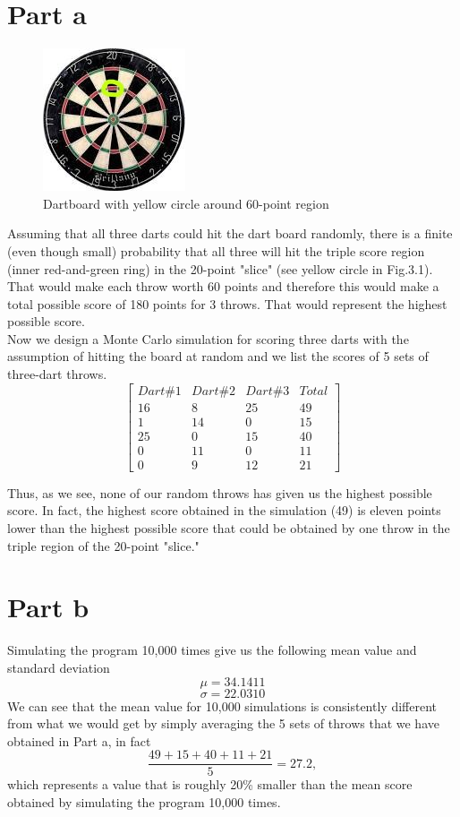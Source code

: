\section{Part a}
\begin{figure}[H]
	\centering
	\includegraphics[scale=1.5]{Dartboard_colors.jpg}
	\caption{Dartboard with yellow circle around 60-point region}
\end{figure}

Assuming that all three darts could hit the dart board randomly, there is a finite (even though small) probability that all three will hit the triple score region (inner red-and-green ring) in the 20-point "slice" (see yellow circle in Fig.3.1). That would make each throw worth 60 points and therefore this would make a total possible score of 180 points for 3 throws. That would represent the highest possible score.\\
Now we design a Monte Carlo simulation for scoring three darts with the assumption of hitting the board at random and we list the scores of 5 sets of three-dart throws.
\[
\begin{bmatrix} 
      					Dart\#1 & Dart\#2 & Dart\#3 & Total \\
     					 16 & 8 & 25 & 49\\
					 1 & 14 & 0 & 15\\
					 25 & 0 & 15 & 40\\
					 0 & 11 & 0 & 11\\
					 0 & 9 & 12 & 21			  
\end{bmatrix}
\]

Thus, as we see, none of our random throws has given us the highest possible score. In fact, the highest score obtained in the simulation (49) is eleven points lower than the highest possible score that could be obtained by one throw in the triple region of the 20-point "slice."\\

\section{Part b}
Simulating the program 10,000 times give us the following mean value and standard deviation
$$
\mu = 34.1411
$$
$$
\sigma = 22.0310
$$
We can see that the mean value for 10,000 simulations is consistently different from what we would get by simply averaging the 5 sets of throws that we have obtained in Part a, in fact
$$
\frac{49+15+40+11+21}{5} = 27.2,
$$
which represents a value that is roughly 20\% smaller than the mean score obtained by simulating the program 10,000 times.

